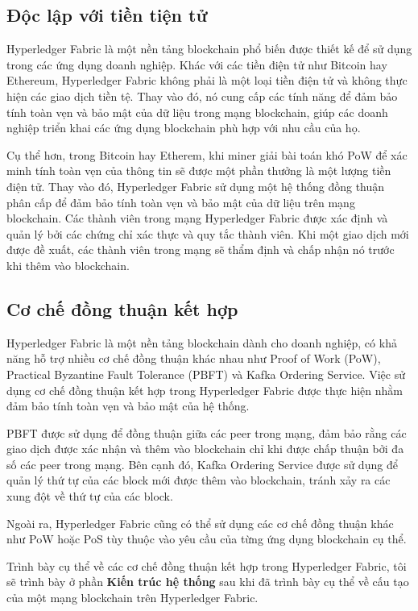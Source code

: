 \subsection{Độc lập với tiền tiện tử}

Hyperledger Fabric là một nền tảng blockchain phổ biến được thiết kế để sử dụng trong các 
ứng dụng doanh nghiệp. Khác với các tiền điện tử như Bitcoin hay Ethereum, Hyperledger 
Fabric không phải là một loại tiền điện tử và không thực hiện các giao dịch tiền tệ. Thay 
vào đó, nó cung cấp các tính năng để đảm bảo tính toàn vẹn và bảo mật của dữ liệu trong 
mạng blockchain, giúp các doanh nghiệp triển khai các ứng dụng blockchain phù hợp với nhu 
cầu của họ.

Cụ thể hơn, trong Bitcoin hay Etherem, khi miner giải bài toán khó PoW để xác minh tính
toàn vẹn của thông tin sẽ được một phần thưởng là một lượng tiền điện tử. Thay vào đó, Hyperledger Fabric
sử dụng một hệ thống đồng thuận phân cấp để đảm bảo tính toàn vẹn và bảo mật của dữ liệu 
trên mạng blockchain. Các thành viên trong mạng Hyperledger Fabric được xác định và quản 
lý bởi các chứng chỉ xác thực và quy tắc thành viên. Khi một giao dịch mới được đề xuất, 
các thành viên trong mạng sẽ thẩm định và chấp nhận nó trước khi thêm vào blockchain.

\subsection{Cơ chế đồng thuận kết hợp}
Hyperledger Fabric là một nền tảng blockchain dành cho doanh nghiệp, có khả năng hỗ trợ 
nhiều cơ chế đồng thuận khác nhau như Proof of Work (PoW), Practical Byzantine Fault 
Tolerance (PBFT) và Kafka Ordering Service. Việc sử dụng cơ chế đồng thuận kết hợp trong 
Hyperledger Fabric được thực hiện nhằm đảm bảo tính toàn vẹn và bảo mật của hệ thống. 

PBFT được sử dụng để đồng thuận giữa các peer trong mạng, đảm bảo rằng các giao dịch 
được xác nhận và thêm vào blockchain chỉ khi được chấp thuận bởi đa số các peer trong mạng. 
Bên cạnh đó, Kafka Ordering Service được sử dụng để quản lý thứ tự của các block mới được 
thêm vào blockchain, tránh xảy ra các xung đột về thứ tự của các block. 

Ngoài ra, Hyperledger Fabric cũng có thể sử dụng các cơ chế đồng thuận khác như PoW hoặc PoS 
tùy thuộc vào yêu cầu của từng ứng dụng blockchain cụ thể. 

Trình bày cụ thể về các cơ chế đồng thuận kết hợp trong Hyperledger Fabric, tôi sẽ trình bày 
ở phần \textbf{Kiến trúc hệ thống} sau khi đã trình bày cụ thể về cấu tạo của một mạng blockchain
trên Hyperledger Fabric. 
